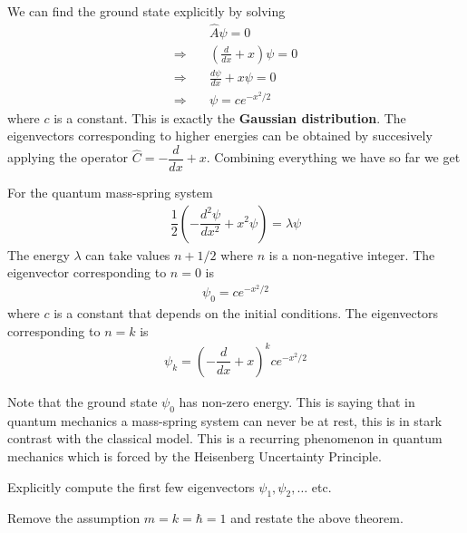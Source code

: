 We can find the ground state explicitly by solving
\begin{align*}
	&\hat{A} \psi = 0 \\
	\Rightarrow\quad &\left( \frac{d}{dx} + x\right) \psi = 0 \\
	\Rightarrow\quad &\frac{d\psi}{dx} + x\psi = 0 \\
	\Rightarrow\quad &\psi = c e^{-x^2/2}
\end{align*}
where $c$ is a constant. This is exactly the \textbf{Gaussian distribution}. The eigenvectors corresponding to higher energies can be obtained by succesively applying the operator $ \hat{C} = -\dfrac{d}{dx} + x$. Combining everything we have so far we get
\begin{mdframed}
	\begin{thm}
		For the quantum mass-spring system \begin{align*}
		\dfrac{1}{2} \left(-\dfrac{d^2 \psi}{d x^2} + {x}^2 \psi \right) = \lambda \psi
	\end{align*}
	The energy $\lambda$ can take values $n + 1/2$ where $n$ is a non-negative integer. The eigenvector corresponding to $n = 0$ is
	\begin{align*}
		\psi_0 = c e^{-x^2/2}
	\end{align*}
	where $c$ is a constant that depends on the initial conditions. The eigenvectors corresponding to $n = k$ is
	\begin{align*}
		\psi_k = \left(-\dfrac{d}{dx} + x\right)^k c e^{-x^2/2}
	\end{align*}
	\end{thm}
\end{mdframed}

\begin{remark}
	Note that the ground state $\psi_0$ has non-zero energy. This is saying that in quantum mechanics a mass-spring system can never be at rest, this is in stark contrast with the classical model. This is a recurring phenomenon in quantum mechanics which is forced by the Heisenberg Uncertainty Principle.
\end{remark}

\begin{ques}
	Explicitly compute the first few eigenvectors $\psi_1, \psi_2, \dots$ etc.
\end{ques}

\begin{ques}
	Remove the assumption $m = k = \hbar = 1$ and restate the above theorem.
\end{ques}

